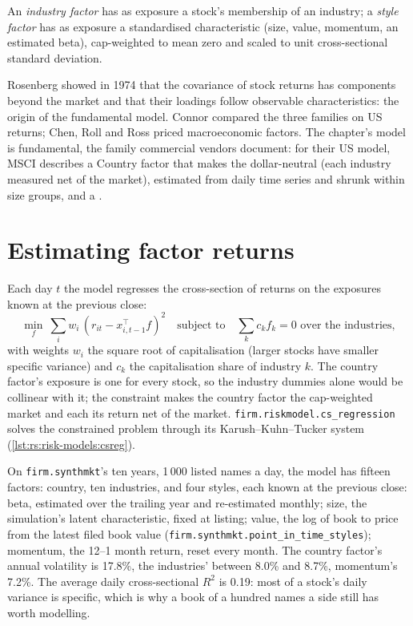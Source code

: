 \begin{definition}\label{def:rs:risk-models:style}
An \emph{industry factor} has as exposure a stock's membership of an industry; a \emph{style factor} has as exposure a
standardised characteristic (size, value, momentum, an estimated beta), cap-weighted to mean zero and scaled to unit cross-sectional standard deviation.
\end{definition}

Rosenberg showed in 1974 that the covariance of stock returns has components beyond the market and that their loadings follow observable characteristics:
the origin of the fundamental model. Connor compared the three families on US returns; Chen, Roll and Ross priced macroeconomic factors. The chapter's model
is fundamental, the family commercial vendors document: for their US model, MSCI describes a Country factor that makes the  dollar-neutral
(each industry measured net of the market),  estimated from daily time series and shrunk within size groups, and a .

\section{Estimating factor returns}

Each day $t$ the model regresses the cross-section of returns on the exposures known at the previous close:
\[
\min_{f}\ \sum_i w_i\,(r_{it} - x_{i,t-1}^\top f)^2 \quad\text{subject to}\quad \sum_k c_k f_{k} = 0 \text{ over the industries},
\]
with weights $w_i$ the square root of capitalisation (larger stocks have smaller specific variance) and $c_k$ the capitalisation share of industry $k$. The
country factor's exposure is one for every stock, so the industry dummies alone would be collinear with it; the constraint makes the country factor the
cap-weighted market and each  its return net of the market. \texttt{firm.riskmodel.cs\_regression} solves the constrained problem through
its Karush--Kuhn--Tucker system (\cref{lst:rs:risk-models:csreg}).

On \texttt{firm.synthmkt}'s ten years, 1\,000 listed names a day, the model has fifteen factors: country, ten industries, and four styles, each known at
the previous close: beta, estimated over the trailing year and re-estimated monthly; size, the simulation's latent characteristic, fixed at listing; value,
the log of book to price from the latest filed book value (\texttt{firm.synthmkt.point\_in\_time\_styles}); momentum, the 12--1 month return, reset every
month. The country factor's annual volatility is 17.8\%, the industries' between 8.0\% and 8.7\%, momentum's 7.2\%. The average daily cross-sectional $R^2$
is 0.19: most of a stock's daily variance is specific, which is why a book of a hundred names a side still has  worth modelling.

